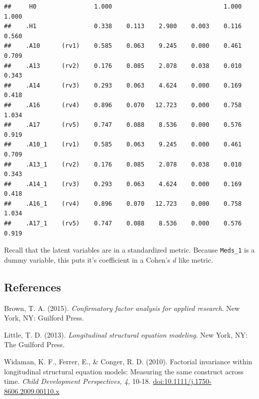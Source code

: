 \documentclass[]{article}
\begin{document}
\begin{verbatim}
##     H0                1.000                               1.000    1.000
##    .H1                0.338    0.113    2.980    0.003    0.116    0.560
##    .A10      (rv1)    0.585    0.063    9.245    0.000    0.461    0.709
##    .A13      (rv2)    0.176    0.085    2.078    0.038    0.010    0.343
##    .A14      (rv3)    0.293    0.063    4.624    0.000    0.169    0.418
##    .A16      (rv4)    0.896    0.070   12.723    0.000    0.758    1.034
##    .A17      (rv5)    0.747    0.088    8.536    0.000    0.576    0.919
##    .A10_1    (rv1)    0.585    0.063    9.245    0.000    0.461    0.709
##    .A13_1    (rv2)    0.176    0.085    2.078    0.038    0.010    0.343
##    .A14_1    (rv3)    0.293    0.063    4.624    0.000    0.169    0.418
##    .A16_1    (rv4)    0.896    0.070   12.723    0.000    0.758    1.034
##    .A17_1    (rv5)    0.747    0.088    8.536    0.000    0.576    0.919
\end{verbatim}

Recall that the latent variables are in a standardized metric. Because
\texttt{Meds\_1} is a dummy variable, this puts it's coefficient in a
Cohen's \(d\) like metric.

\subsection{References}\label{references}

Brown, T. A. (2015). \emph{Confirmatory factor analysis for applied
research}. New York, NY: Guilford Press.

Little, T. D. (2013). \emph{Longitudinal structural equation modeling}.
New York, NY: The Guilford Press.

Widaman, K. F., Ferrer, E., \& Conger, R. D. (2010). Factorial
invariance within longitudinal structural equation models: Measuring the
same construct across time. \emph{Child Development Perspectives, 4},
10-18. \url{doi:10.1111/j.1750-8606.2009.00110.x}
\end{document}
